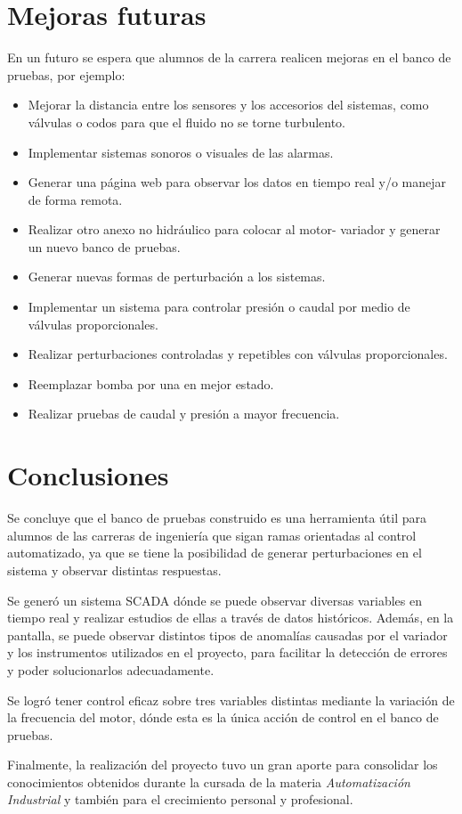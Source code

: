 
\newpage

\section{Mejoras futuras}
En un futuro se espera que alumnos de la carrera realicen mejoras en el banco de pruebas, por ejemplo:
\begin{itemize}
	\item Mejorar la distancia entre los sensores y los accesorios del sistemas, como válvulas o codos para que el fluido no se torne turbulento.
	\item Implementar sistemas sonoros o visuales de las alarmas.
	\item Generar una página web para observar los datos en tiempo real y/o manejar de forma remota.
	\item Realizar otro anexo no hidráulico para colocar al motor- variador y generar un nuevo banco de pruebas.
	\item Generar nuevas formas de perturbación a los sistemas.
	\item Implementar un sistema para controlar presión o caudal por medio de válvulas proporcionales.
	\item Realizar perturbaciones controladas y repetibles con válvulas proporcionales.
	\item Reemplazar bomba por una en mejor estado.
	\item Realizar pruebas de caudal y presión a mayor frecuencia.
\end{itemize}

\newpage
\section{Conclusiones}
Se concluye que el banco de pruebas construido es una herramienta útil para alumnos de las carreras de ingeniería que sigan ramas orientadas al control automatizado, ya que se tiene la posibilidad de generar perturbaciones en el sistema y observar distintas respuestas.

Se generó un sistema SCADA dónde se puede observar diversas variables en tiempo real y realizar estudios de ellas a través de datos históricos. Además, en la pantalla, se puede observar distintos tipos de anomalías causadas por el variador y los instrumentos utilizados en el proyecto, para facilitar la detección de errores y poder solucionarlos adecuadamente.

Se logró tener control eficaz sobre tres variables distintas mediante la variación de la frecuencia del motor, dónde esta es la única acción de control en el banco de pruebas.

Finalmente, la realización del proyecto tuvo un gran aporte para consolidar los conocimientos obtenidos durante la cursada de la materia \textit{Automatización Industrial} y también para el crecimiento personal y profesional.



\newpage